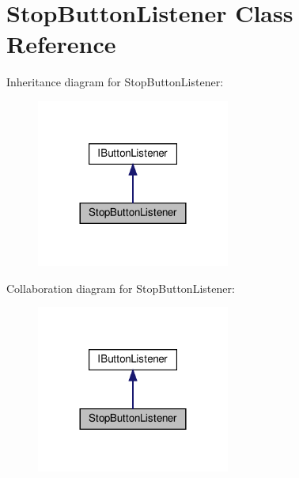 \hypertarget{classStopButtonListener}{}\section{Stop\+Button\+Listener Class Reference}
\label{classStopButtonListener}


Inheritance diagram for Stop\+Button\+Listener\+:
\nopagebreak
\begin{figure}[H]
\begin{center}
\leavevmode
\includegraphics[width=180pt]{classStopButtonListener__inherit__graph}
\end{center}
\end{figure}


Collaboration diagram for Stop\+Button\+Listener\+:
\nopagebreak
\begin{figure}[H]
\begin{center}
\leavevmode
\includegraphics[width=180pt]{classStopButtonListener__coll__graph}
\end{center}
\end{figure}
